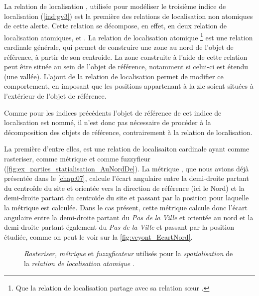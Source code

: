 La relation de localisation ,
utilisée pour modéliser le troisième indice de localisation
(\ref{ind:gv3}) est la première des relations de localisation non
atomiques de cette alerte. Cette relation se décompose, en effet, en
deux relation de localisation atomiques,  et
. La relation de localisation
atomique  \footnote{Que la relation de
  localisation \protect{} partage avec
  sa relation sœur \protect{}.}
est une relation cardinale générale, qui permet de construire une zone
au nord de l'objet de référence, à partir de son centroide. La zone
construite à l'aide de cette relation peut être située au sein de
l'objet de référence, notamment si celui-ci est étendu (\eg une
vallée). L'ajout de la relation de localisation
 permet de modifier ce
comportement, en imposant que les positions appartenant à la \ac{zlc}
soient situées à l'extérieur de l'objet de référence.

Comme pour les indices précédents l'objet de référence de cet indice
de localisation est nommé, il n'est donc pas nécessaire de procéder à
la décomposition des objets de référence, contrairement à la relation
de localisation.

La première d'entre elles,  est une relation
de localisaiton cardinale ayant  comme
rasteriser,  comme métrique et
 comme fuzzyfieur
(\autoref{fig:ex_parties_statialisation_AuNordDe}). La métrique
, que nous avions déjà présentée dans le
\autoref{chap:07}, calcule l'écart angulaire entre la demi-droite
partant du centroïde du site et orientée vers la direction de
référence (ici le Nord) et la demi-droite partant du centroïde du
site et passant par la position pour laquelle la métrique est
calculée. Dans le cas présent, cette métrique calcule donc l'écart
angulaire entre la demi-droite partant du \emph{Pas de la Ville} et
orientée au nord et la demi-droite partant également du \emph{Pas de
  la Ville} et passant par la position étudiée, comme on peut le voir
sur la \autoref{fig:veyont_EcartNord}.

\begin{figure}
  \centering
  
  \caption{\emph{Rasteriser,} \emph{métrique} et \emph{fuzzyficateur}
    utilisés pour la \emph{spatialisation} de la \emph{relation de
      localisation atomique} \protect{}.}
  \label{fig:ex_parties_statialisation_AuNordDe}
\end{figure}


